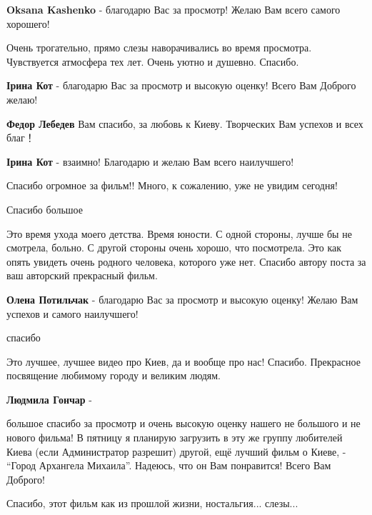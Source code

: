 \begin{itemize}
\textbf{Oksana Kashenko} - благодарю Вас за просмотр! Желаю Вам всего самого хорошего!


Очень трогательно, прямо слезы наворачивались во время просмотра. Чувствуется
атмосфера тех лет. Очень уютно и душевно. Спасибо.

\begin{itemize} %
\textbf{Ірина Кот} - благодарю Вас за просмотр и высокую оценку! Всего Вам Доброго желаю!

\textbf{Федор Лебедев} Вам спасибо, за любовь к Киеву. Творческих Вам успехов и всех благ！

\textbf{Ірина Кот} - взаимно! Благодарю и желаю Вам всего наилучшего!
\end{itemize} %

Спасибо огромное за фильм!! Много, к сожалению, уже не увидим сегодня!

Спасибо большое


Это время ухода моего детства. Время юности. С одной стороны, лучше бы не
смотрела, больно. С другой стороны очень хорошо, что посмотрела. Это как опять
увидеть очень родного человека, которого уже нет. Спасибо автору поста за ваш
авторский прекрасный фильм.

\textbf{Олена Потильчак} - благодарю Вас за просмотр и высокую оценку! Желаю Вам успехов и самого наилучшего!

спасибо


Это лучшее, лучшее видео про Киев, да и вообще про нас! Спасибо. Прекрасное
посвящение любимому городу и великим людям.

\begin{itemize} %
\textbf{Людмила Гончар} - 

большое спасибо за просмотр и очень высокую оценку нашего не большого и не
нового фильма! В пятницу я планирую загрузить в эту же группу любителей Киева
(если Администратор разрешит) другой, ещё лучший фильм о Киеве, - \enquote{Город
Архангела Михаила}. Надеюсь, что он Вам понравится! Всего Вам Доброго!

\end{itemize} %

Спасибо, этот фильм как из прошлой жизни, ностальгия... слезы...


\end{itemize}
